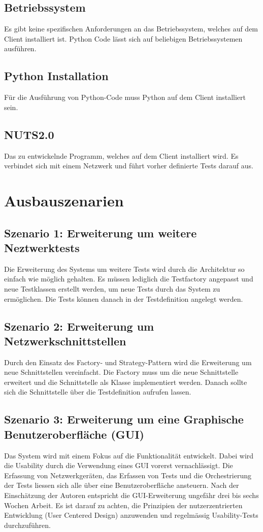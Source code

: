 \documentclass[
	ngerman,
	toc=listof, %
	toc=bibliography, %
	footnotes=multiple, %
	parskip=half, %
	numbers=noendperiod %
]{scrartcl}
\begin{document}
		\subsection{Betriebssystem}
		Es gibt keine spezifischen Anforderungen an das Betriebssystem, welches auf dem Client installiert ist.
		Python Code lässt sich auf beliebigen Betriebssystemen ausführen.

		\subsection{Python Installation}
		Für die Ausführung von Python-Code muss Python auf dem Client installiert sein. 

		\subsection{NUTS2.0}
		Das zu entwickelnde Programm, welches auf dem Client installiert wird. 
		Es verbindet sich mit einem Netzwerk und führt vorher definierte Tests darauf aus.

\section{Ausbauszenarien}
	\subsection{Szenario 1: Erweiterung um weitere Neztwerktests}
	Die Erweiterung des Systems um weitere Tests wird durch die Architektur so einfach wie möglich gehalten.
	Es müssen lediglich die Testfactory angepasst und neue Testklassen erstellt werden, um neue Tests durch das System zu ermöglichen.
	Die Tests können danach in der Testdefinition angelegt werden.

	\subsection{Szenario 2: Erweiterung um Netzwerkschnittstellen}
	Durch den Einsatz des Factory- und Strategy-Pattern wird die Erweiterung um neue Schnittstellen vereinfacht.
	Die Factory muss um die neue Schnittstelle erweitert und die Schnittstelle als Klasse implementiert werden.
	Danach sollte sich die Schnittstelle über die Testdefinition aufrufen lassen.

	\subsection{Szenario 3: Erweiterung um eine Graphische Benutzeroberfläche (GUI)}
	Das System wird mit einem Fokus auf die Funktionalität entwickelt.
	Dabei wird die Usability durch die Verwendung eines GUI vorerst vernachlässigt.
	Die Erfassung von Netzwerkgeräten, das Erfassen von Tests und die Orchestrierung der Tests liessen sich alle über eine Benutzeroberfläche ansteuern.
	Nach der Einschätzung der Autoren entspricht die GUI-Erweiterung ungefähr drei bis sechs Wochen Arbeit.
	Es ist darauf zu achten, die Prinzipien der nutzerzentrierten Entwicklung (User Centered Design) anzuwenden und regelmässig Usability-Tests durchzuführen.
\end{document}

